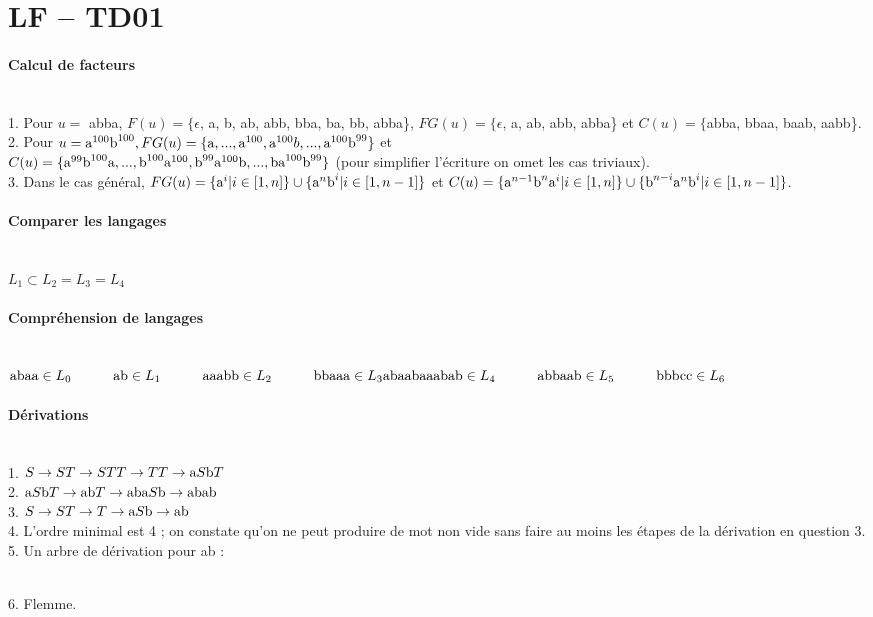 \documentclass[a4paper]{article}
\newcommand{\ct}{\textnormal}
\newcommand{\la}{\ct{a}}
\newcommand{\lb}{\ct{b}}
\newcommand{\blank}{\hspace*{3em}}
\begin{document}
\section*{LF -- TD01}

\paragraph{Calcul de facteurs}~\\
1. Pour $u = $ abba, $F(u)=\{\epsilon$, a, b, ab, abb, bba, ba, bb, abba\}, $FG(u)=\{\epsilon$, a, ab, abb, abba\} et $C(u) =\{$abba, bbaa, baab, aabb\}.\\
2. Pour $u=\ct{a}^{100}\ct{b}^{100}, FG(u) = \{\ct{a},...,\ct{a}^{100}, \ct{a}^{100}b, ..., \ct{a}^{100}\ct{b}^{99}\}$ et\\$C(u) = \{\ct{a}^{99}\ct{b}^{100}\ct{a}, ..., \ct{b}^{100}\ct{a}^{100}, \ct{b}^{99}\ct{a}^{100}\ct{b}, ..., \ct{ba}^{100}\ct{b}^{99}\}$ (pour simplifier l'écriture on omet les cas triviaux).\\
3. Dans le cas général, $FG(u) = \{\la^i|i\in[1,n]\} \cup \{\la^n\lb^i|i\in[1,n-1]\}$ et $C(u) = \{\la^{n-1}\lb^n\la^i|i\in[1,n]\} \cup \{\lb^{n-i}\la^n\lb^i|i\in[1,n-1]\}$.

\paragraph{Comparer les langages}~\\
$L_1\subset L_2 = L_3 = L_4$

\paragraph{Compréhension de langages}~\\
$\ct{abaa}\in L_0 \blank \ct{ab}\in L_1 \blank \ct{aaabb}\in L_2 \blank \ct{bbaaa}\in L_3\\
\ct{abaabaaabab}\in L_4 \blank \ct{abbaab}\in L_5 \blank \ct{bbbcc}\in L_6$

\paragraph{Dérivations}~\\
1. $S\rightarrow ST\rightarrow STT \rightarrow TT \rightarrow \ct{a}S\ct{b}T$\\
2. $\ct{a}S\ct{b}T \rightarrow \ct{ab}T \rightarrow \ct{aba}S\ct{b} \rightarrow \ct{abab}$\\
3. $S\rightarrow ST\rightarrow T\rightarrow \ct{a}S\ct{b} \rightarrow \ct{ab}$\\
4. L'ordre minimal est 4 ; on constate qu'on ne peut produire de mot non vide sans faire au moins les étapes de la dérivation en question 3.\\
5. Un arbre de dérivation pour ab :\\
\\
6. Flemme.
\end{document}
